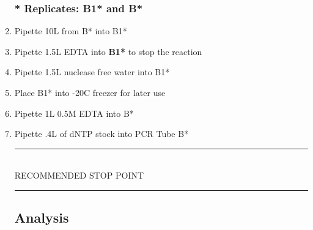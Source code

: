 \documentclass[letterpaper]{article}
\newcommand{\C}{\degree{}C}
\newcommand{\uL}{\micro{}L}
\newcommand{\RstopPoint}{\begin{center}
\rule{0.5\textwidth}{.4mm}\\
\vspace{1mm} 
RECOMMENDED STOP POINT\\
\rule{0.5\textwidth}{.4mm}
\end{center}}
\begin{document}
\begin{enumerate}
\subsubsection{\textbf{*} Replicates: B1* and B*}
\item{Pipette 10\uL{} from B* into B1*\label{2B1}}
\item{Pipette 1.5\uL{} EDTA into \textbf{B1*} to stop the reaction \cite{Invitrogen2002}\label{2B2}}
\item{Pipette 1.5\uL{} nuclease free water into B1*\label{2B3}}
\item{Place B1* into -20\C{} freezer for later use\label{2B4}}
\item{Pipette 1\uL{} 0.5M EDTA into B*\label{2B5}}
\item{Pipette .4\uL{} of dNTP stock into PCR Tube B*\label{2B6}}

\RstopPoint{} 
\subsection{Analysis}

\end{enumerate}
\end{document}
